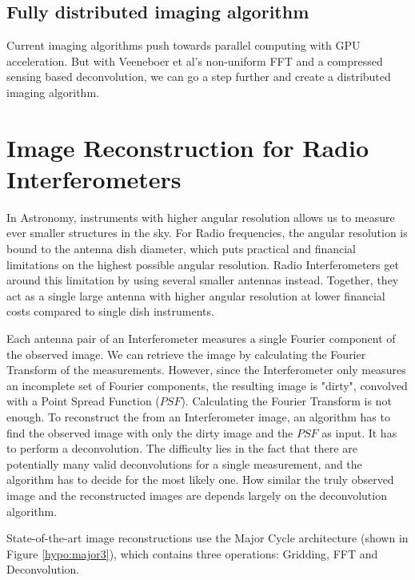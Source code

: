 \subsection{Fully distributed imaging algorithm}
Current imaging algorithms push towards parallel computing with GPU acceleration. But with Veeneboer et al's non-uniform FFT and a compressed sensing based deconvolution, we can go a step further and create a distributed imaging algorithm. 


\pagebreak
\section{Image Reconstruction for Radio Interferometers}
In Astronomy, instruments with higher angular resolution allows us to measure ever smaller structures in the sky. For Radio frequencies, the angular resolution is bound to the antenna dish diameter, which puts practical and financial limitations on the highest possible angular resolution. Radio Interferometers get around this limitation by using several smaller antennas instead. Together, they act as a single large antenna with higher angular resolution at lower financial costs compared to single dish instruments.

Each antenna pair of an Interferometer measures a single Fourier component of the observed image. We can retrieve the image by calculating the Fourier Transform of the measurements. However, since the Interferometer only measures an incomplete set of Fourier components, the resulting image is "dirty", convolved with a Point Spread Function ($PSF$). Calculating the Fourier Transform is not enough. To reconstruct the from an Interferometer image, an algorithm has to find the observed image with only the dirty image and the $PSF$ as input. It has to perform a deconvolution. The difficulty lies in the fact that there are potentially many valid deconvolutions for a single measurement, and the algorithm has to decide for the most likely one. How similar the truly observed image and the reconstructed images are depends largely on the deconvolution algorithm.

State-of-the-art image reconstructions use the Major Cycle architecture (shown in Figure \ref{hypo:major3}), which contains three operations: Gridding, FFT and Deconvolution.

